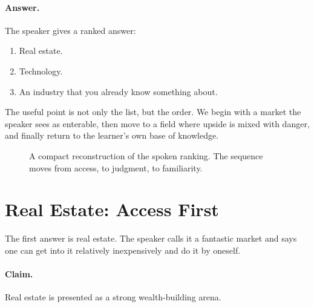 \paragraph{Answer.}
The speaker gives a ranked answer:

\begin{enumerate}
\item Real estate.
\item Technology.
\item An industry that you already know something about.
\end{enumerate}

The useful point is not only the list, but the order. We begin with a market the speaker sees as enterable, then move to a field where upside is mixed with danger, and finally return to the learner's own base of knowledge.

\begin{figure}
\centering
{}
\caption{A compact reconstruction of the spoken ranking. The sequence moves from access, to judgment, to familiarity.}
\end{figure}

\section{Real Estate: Access First}

The first answer is real estate. The speaker calls it a fantastic market and says one can get into it relatively inexpensively and do it by oneself.

\paragraph{Claim.}
Real estate is presented as a strong wealth-building arena.

